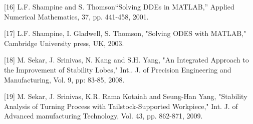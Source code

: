 \documentclass[10pt]{article}
\begin{document}
[16] L.F. Shampine and S. Thomson“Solving DDEs in MATLAB,” Applied Numerical Mathematics, 37, pp. 441-458, 2001.

[17] L.F. Shampine, I. Gladwell, S. Thomson, "Solving ODES with MATLAB," Cambridge University press, UK, 2003.

[18] M. Sekar, J. Srinivas, N. Kang and S.H. Yang, "An Integrated Approach to the Improvement of Stability Lobes," Int.. J. of Precision Engineering and Manufacturing, Vol. 9, pp: 83-85, 2008.

[19] M. Sekar, J. Srinivas, K.R. Rama Kotaiah and Seung-Han Yang, "Stability Analysis of Turning Process with Tailstock-Supported Workpiece," Int. J. of Advanced manufacturing Technology, Vol. 43, pp. 862-871, 2009.
\end{document}

